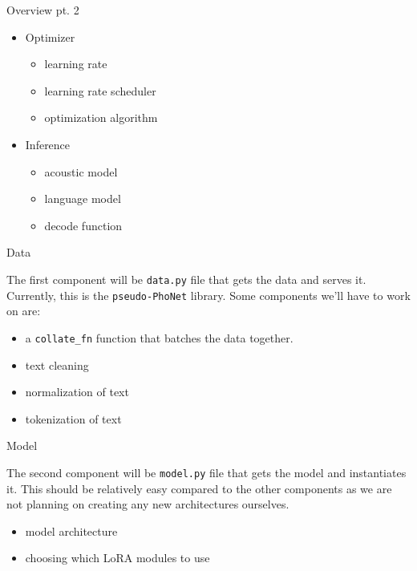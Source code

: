 \documentclass{beamer}
\begin{document}
\begin{frame}{Overview pt. 2}
  \begin{itemize}
  \item 
    Optimizer
    \begin{itemize}
    \item learning rate
    \item learning rate scheduler
    \item optimization algorithm
    \end{itemize}
  \item 
    Inference
    \begin{itemize}
    \item acoustic model
    \item language model
    \item decode function
    \end{itemize}
  \end{itemize}
\end{frame}

\begin{frame}{Data}

  The first component will be \texttt{data.py} file that gets the data and serves it.
  Currently, this is the \texttt{pseudo-PhoNet} library.
  Some components we'll have to work on are:
  \begin{itemize}
  \item a \texttt{collate\_fn} function that batches the data together.
  \item text cleaning
  \item normalization of text
  \item tokenization of text
  \end{itemize}
\end{frame}

\begin{frame}{Model}

  The second component will be \texttt{model.py} file that gets the model and instantiates it.
  This should be relatively easy compared to the other components as we are not planning on creating any new
  architectures ourselves.
  \begin{itemize}
  \item model architecture
  \item choosing which LoRA modules to use
  \end{itemize}
\end{frame}
\end{document}
